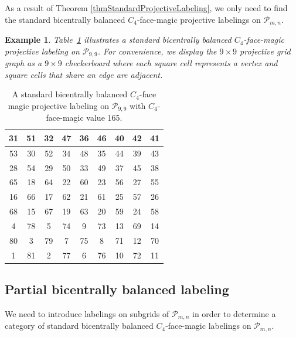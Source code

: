 \documentclass[12pt]{amsart}
\theoremstyle{definition}
\theoremstyle{plain}
\newtheorem{example}[definition]{Example}
\begin{document}
As a result of Theorem \ref{thmStandardProjectiveLabeling}, we only need to find the
standard bicentrally balanced $C_4$-face-magic projective labelings on $\mathcal{P}_{m,n}$.

\begin{example}
Table~\ref{tableProj9x9Labelingexample} illustrates a standard bicentrally balanced $C_4$-face-magic projective
labeling on $\mathcal{P}_{9,9}$.
For convenience, we display the $9 \times 9$ projective grid graph as a $9 \times 9$ checkerboard where each square cell represents a vertex
  and square cells that share an edge are adjacent.
\end{example}

\begin{table}[h]
\hspace{0.0in}\begin{tabular}{|c|c|c|c|c|c|c|c|c|}
\hline
31  &51  &32   &47  &36  &46  &40  &42  &41    \\[0.05in]
\hline
53  &30  &52   &34  &48  &35  &44  &39  &43    \\[0.05in]
\hline
28  &54  &29   &50  &33  &49  &37  &45  &38    \\[0.05in]
\hline
65  &18  &64   &22  &60  &23  &56  &27  &55    \\[0.05in]
\hline
16   &66  &17   &62  &21  &61  &25  &57  &26     \\[0.05in]
\hline
68  &15  &67   &19  &63  &20  &59  &24  &58    \\[0.05in]
\hline
4  &78  &5   &74  &9   &73  &13  &69  &14     \\[0.05in]
\hline
80  &3   &79   &7   &75  &8   &71  &12  &70     \\[0.05in]
\hline
1   &81  &2    &77  &6   &76  &10  &72  &11     \\[0.05in]
\hline
\end{tabular}
\caption{A standard bicentrally balanced $C_4$-face magic projective labeling on $\mathcal{P}_{9,9}$ with $C_4$-face-magic value 165.}
\label{tableProj9x9Labelingexample}
\end{table}

\subsection{Partial bicentrally balanced labeling}

We need to introduce labelings on subgrids of $\mathcal{P}_{m,n}$ in order to determine a category of
standard bicentrally balanced $C_4$-face-magic labelings on $\mathcal{P}_{m,n}$.
\end{document}
